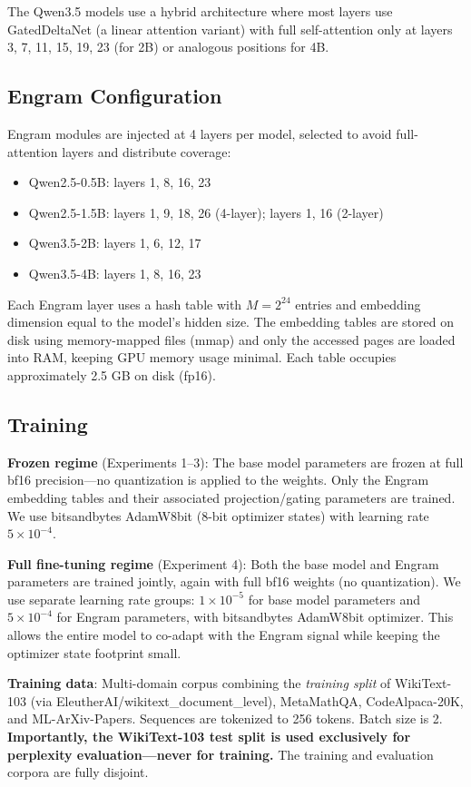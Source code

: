\documentclass{article}
\begin{document}
The Qwen3.5 models use a hybrid architecture where most layers use GatedDeltaNet (a linear attention variant) with full self-attention only at layers 3, 7, 11, 15, 19, 23 (for 2B) or analogous positions for 4B.

\subsection{Engram Configuration}

Engram modules are injected at 4 layers per model, selected to avoid full-attention layers and distribute coverage:
\begin{itemize}[nosep]
    \item Qwen2.5-0.5B: layers 1, 8, 16, 23
    \item Qwen2.5-1.5B: layers 1, 9, 18, 26 (4-layer); layers 1, 16 (2-layer)
    \item Qwen3.5-2B: layers 1, 6, 12, 17
    \item Qwen3.5-4B: layers 1, 8, 16, 23
\end{itemize}

Each Engram layer uses a hash table with $M = 2^{24}$ entries and embedding dimension equal to the model's hidden size. The embedding tables are stored on disk using memory-mapped files (mmap) and only the accessed pages are loaded into RAM, keeping GPU memory usage minimal. Each table occupies approximately 2.5 GB on disk (fp16).

\subsection{Training}

\textbf{Frozen regime} (Experiments 1--3): The base model parameters are frozen at full bf16 precision---no quantization is applied to the weights. Only the Engram embedding tables and their associated projection/gating parameters are trained. We use bitsandbytes AdamW8bit (8-bit optimizer states) with learning rate $5 \times 10^{-4}$.

\textbf{Full fine-tuning regime} (Experiment 4): Both the base model and Engram parameters are trained jointly, again with full bf16 weights (no quantization). We use separate learning rate groups: $1 \times 10^{-5}$ for base model parameters and $5 \times 10^{-4}$ for Engram parameters, with bitsandbytes AdamW8bit optimizer. This allows the entire model to co-adapt with the Engram signal while keeping the optimizer state footprint small.

\textbf{Training data}: Multi-domain corpus combining the \emph{training split} of WikiText-103 (via EleutherAI/wikitext\_document\_level), MetaMathQA, CodeAlpaca-20K, and ML-ArXiv-Papers. Sequences are tokenized to 256 tokens. Batch size is 2. \textbf{Importantly, the WikiText-103 test split is used exclusively for perplexity evaluation---never for training.} The training and evaluation corpora are fully disjoint.
\end{document}
